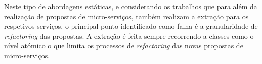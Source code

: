     Neste tipo de abordagens estáticas, e considerando os trabalhos que para além da realização de propostas de micro-serviços, também realizam a extração para os respetivos serviços, o principal ponto identificado como falha é a granularidade de \textit{refactoring} das propostas. A extração é feita sempre recorrendo a classes como o nível atómico o que limita os processos de \textit{refactoring} das novas propostas de micro-serviços.
    
    
    







